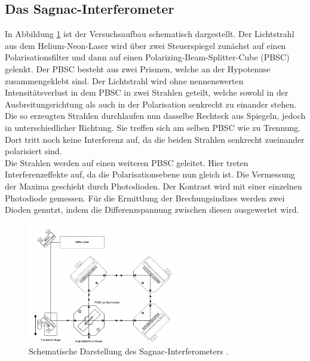 \subsection{Das Sagnac-Interferometer}
\label{sec:SI}
In Abbildung \ref{fig:Aufbau} ist der Versuchsaufbau schematisch dargestellt. Der
Lichtstrahl aus dem Helium-Neon-Laser wird über zwei Steuerspiegel zunächst auf einen Polarisationsfilter
und dann auf einen Polarizing-Beam-Splitter-Cube (PBSC) gelenkt. Der PBSC besteht aus zwei Prismen, welche
an der Hypotenuse zusammengeklebt sind. Der Lichtstrahl wird ohne nennenswerten Intensitätsverlust
in dem PBSC in zwei Strahlen geteilt,
welche sowohl in der Ausbreitungsrichtung als auch in der Polarisation senkrecht zu einander stehen. Die
so erzeugten Strahlen durchlaufen nun dasselbe Rechteck aus Spiegeln, jedoch in unterschiedlicher Richtung.
Sie treffen sich am selben PBSC wie zu Trennung. Dort tritt noch keine Interferenz auf,
da die beiden Strahlen senkrecht zueinander polarisiert sind.\\
Die Strahlen werden auf einen weiteren PBSC geleitet. Hier treten Interferenzeffekte auf, da
die Polarisationsebene nun gleich ist. Die Vermessung der Maxima geschieht durch Photodioden.
Der Kontrast wird mit einer einzelnen Photodiode gemessen. Für die Ermittlung der Brechungsindizes werden
zwei Dioden genutzt, indem die Differenzspannung zwischen diesen ausgewertet wird.
\begin{figure}[H]
  \centering
  \includegraphics[width=0.6\textwidth]{pics/Aufbau.png}
  \caption{Schematische Darstellung des Sagnac-Interferometers \cite{Anleitung}.}
  \label{fig:Aufbau}
\end{figure}
